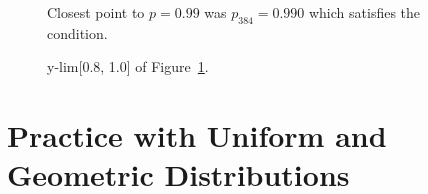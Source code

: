 \documentclass[twocolumn]{article}
\begin{document}
\begin{figure}[H]
    \centering
    \caption{Closest point to $p=0.99$ was $p_{384}=0.990$ which satisfies the condition.}
    \label{fig:Figure2}
\end{figure}

\begin{figure}[H]
    \centering
    \caption{y-lim[0.8, 1.0] of Figure~\ref{fig:Figure2}.}
\end{figure}


\section{Practice with Uniform and Geometric Distributions}


%
%
\end{document}
